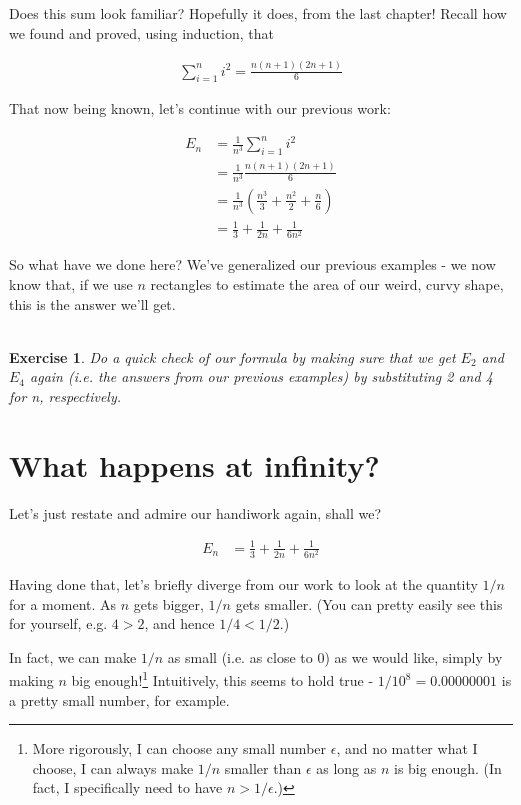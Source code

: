 \documentclass{book}
\newtheorem{exercise}{\\ \bf Exercise}
\begin{document}
Does this sum look familiar? Hopefully it does, from the last chapter! Recall how we found and proved, using induction, that 

\begin{align*}
\sum_{i=1}^n i^2 = \frac{n(n+1)(2n+1)}{6}
\end{align*}

That now being known, let's continue with our previous work:


\begin{align*}
E_n &= \frac{1}{n^3} \sum_{i=1}^n i^2 \\
&= \frac{1}{n^3} \frac{n(n+1)(2n+1)}{6} \\
&= \frac{1}{n^3} \left( \frac{n^3}{3} + \frac{n^2}{2} + \frac{n}{6} \right) \\
&= \frac{1}{3} + \frac{1}{2n} + \frac{1}{6n^2}
\end{align*}

So what have we done here? We've generalized our previous examples - we now know that, if we use $n$ rectangles to estimate the area of our weird, curvy shape, this is the answer we'll get.

\begin{exercise}
Do a quick check of our formula by making sure that we get $E_2$ and $E_4$ again (i.e. the answers from our previous examples) by substituting 2 and 4 for n, respectively.
\end{exercise}


\section{What happens at infinity?}

Let's just restate and admire our handiwork again, shall we?


\begin{align*}
E_n &= \frac{1}{3} + \frac{1}{2n} + \frac{1}{6n^2}
\end{align*}

Having done that, let's briefly diverge from our work to look at the quantity $1/n$ for a moment. As $n$ gets bigger, $1/n$ gets smaller. (You can pretty easily see this for yourself, e.g. $4 > 2$, and hence $1/4 < 1/2$.) 

In fact, we can make $1/n$ as small (i.e. as close to 0) as we would like, simply by making $n$ big enough!\footnote{More rigorously, I can choose any small number $\epsilon$, and no matter what I choose, I can always make $1/n$ smaller than $\epsilon$ as long as $n$ is big enough. (In fact, I specifically need to have $n > 1/\epsilon$.)} Intuitively, this seems to hold true - $1/10^8 = 0.00000001$ is a pretty small number, for example.
\end{document}
